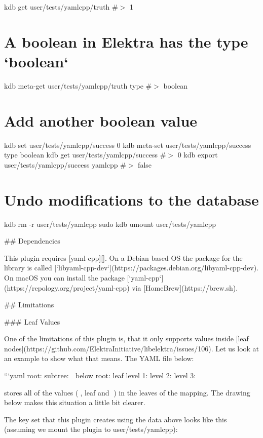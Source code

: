 kdb get user/tests/yamlcpp/truth \#$>$ 1\hypertarget{autotoc_md865_autotoc_md934}{}\section{A boolean in Elektra has the type `boolean`}\label{autotoc_md865_autotoc_md934}
kdb meta-\/get user/tests/yamlcpp/truth type \#$>$ boolean\hypertarget{autotoc_md865_autotoc_md935}{}\section{Add another boolean value}\label{autotoc_md865_autotoc_md935}
kdb set user/tests/yamlcpp/success 0 kdb meta-\/set user/tests/yamlcpp/success type boolean kdb get user/tests/yamlcpp/success \#$>$ 0 kdb export user/tests/yamlcpp/success yamlcpp \#$>$ false\hypertarget{autotoc_md865_autotoc_md936}{}\section{Undo modifications to the database}\label{autotoc_md865_autotoc_md936}
kdb rm -\/r user/tests/yamlcpp sudo kdb umount user/tests/yamlcpp 
\begin{DoxyCode}
## Dependencies

This plugin requires [yaml-cpp][]. On a Debian based OS the package for the library is called
       [`libyaml-cpp-dev`](https://packages.debian.org/libyaml-cpp-dev). On macOS you can install the package
       [`yaml-cpp`](https://repology.org/project/yaml-cpp) via [HomeBrew](https://brew.sh).

## Limitations

### Leaf Values

One of the limitations of this plugin is, that it only supports values inside [leaf
       nodes](https://github.com/ElektraInitiative/libelektra/issues/106). Let us look at an example to show what that means. The YAML
       file below:

```yaml
root:
  subtree: 🍂
  below root: leaf
level 1:
  level 2:
    level 3: 🍁
\end{DoxyCode}


stores all of the values ({\ttfamily 🍂}, {\ttfamily leaf} and {\ttfamily 🍁}) in the leaves of the mapping. The drawing below makes this situation a little bit clearer.



The key set that this plugin creates using the data above looks like this (assuming we mount the plugin to {\ttfamily user/tests/yamlcpp})\+:

